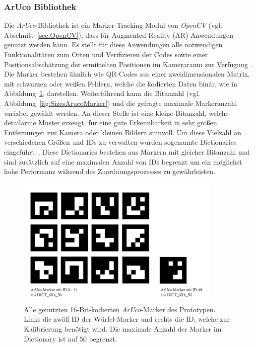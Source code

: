 \subsubsection{ArUco Bibliothek}\label{sec:aruco}%
Die \textit{ArUco}-Bibliothek ist ein Marker-Tracking-Modul von \textit{OpenCV} (vgl. Abschnitt~\ref{sec:OpenCV}), dass für Augmented Reality (AR) Anwendungen genutzt werden kann. Es stellt für diese Anwendungen alle notwendigen Funktionalitäten zum Orten und Verifizieren der Codes sowie einer Positionsabschätzung der ermittelten Positionen im Kameraraum zur Verfügung \cite{article:Aruco2014}. 
Die Marker bestehen ähnlich wie QR-Codes aus einer zweidimensionalen Matrix, mit schwarzen oder weißen Feldern, welche die kodierten Daten binär, wie in Abbildung~\ref{fig:AllUsedArucoMarker}, darstellen.  Weiterführend kann die Bitanzahl (vgl. Abbildung~\ref{fig:SizesArucoMarker}) und die gefragte maximale Markeranzahl variabel gewählt werden. An dieser Stelle ist eine kleine Bitanzahl, welche detailarme Muster erzeugt, für eine gute Erkennbarkeit in sehr großen Entfernungen zur Kamera oder kleinen Bildern sinnvoll. Um diese Vielzahl an verschiedenen Größen und IDs zu verwalten wurden sogenannte Dictionaries eingeführt~\cite{article:ArucoDictGarridoJurado2015}. Diese Dictionaries bestehen aus Markern mit gleicher Bitanzahl und sind zusätzlich auf eine maximalen Anzahl von IDs begrenzt um ein möglichst hohe Performanz während des Zuordnungsprozesses zu gewährleisten.\\

\begin{figure}[H] 
	\center 
	\includegraphics[width=10cm]{Bilder/Aruco_marker.jpg}			
	\caption[Verwendete \textit{ArUco}-Marker]{Alle genutzten 16-Bit-kodierten \textit{ArUco}-Marker des Prototypen. Links die zwölf ID der Würfel-Marker und rechts die ID, welche zur Kalibrierung benötigt wird. Die maximale Anzahl der Marker im Dictionary ist auf $50$ begrenzt.}
	\label{fig:AllUsedArucoMarker}
\end{figure}

